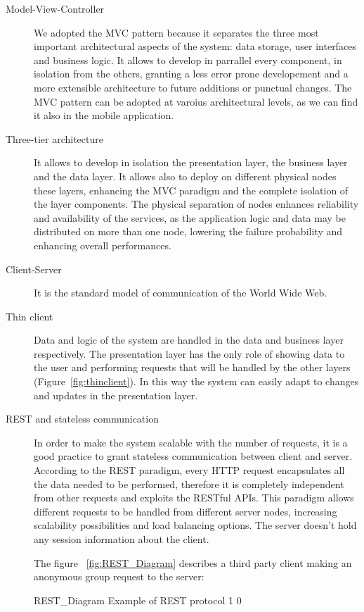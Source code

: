 \documentclass[../DD0.tex]{subfiles}
\begin{document}
    \begin{description}
      \item[Model-View-Controller] We adopted the MVC pattern because it separates the three most important architectural aspects of the system: data storage, user interfaces and business logic. It allows to develop in parrallel every component, in isolation from the others, granting a less error prone developement and a more extensible architecture to future additions or punctual changes. The MVC pattern can be adopted at varoius architectural levels, as we can find it also in the mobile application.
      \item[Three-tier architecture] It allows to develop in isolation the presentation layer, the business layer and the data layer. It allows also to deploy on different physical nodes these layers, enhancing the MVC paradigm and the complete isolation of the layer components. The physical separation of nodes enhances reliability and availability of the services, as the application logic and data may be distributed on more than one node, lowering the failure probability and enhancing overall performances.
      \item[Client-Server] It is the standard model of communication of the World Wide Web.
      \item[Thin client] Data and logic of the system are handled in the data and business layer respectively. The presentation layer has the only role of showing data to the user and performing requests that will be handled by the other layers (Figure~\ref{fig:thinclient}). In this way the system can easily adapt to changes and updates in the presentation layer.
      \item[REST and stateless communication] In order to make the system scalable with the number of requests, it is a good practice to grant stateless communication between client and server. According to the REST paradigm, every HTTP request encapsulates all the data needed to be performed, therefore it is completely independent from other requests and exploits the RESTful APIs. This paradigm allows different requests to be handled from different server nodes, increasing scalability possibilities and load balancing options. The server doesn't hold any session information about the client.

      The figure ~\ref{fig:REST_Diagram} describes a third party client making an anonymous group request to the server:

      \fetchUML
        {REST_Diagram}
        {Example of REST protocol}
        {1}           %
        {0}           %


\end{description}
\end{document}
